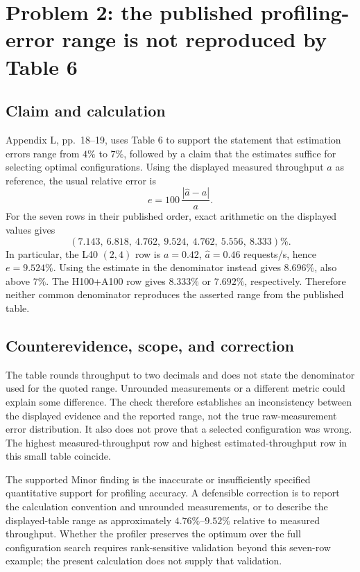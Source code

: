 \documentclass[10pt]{article}
\begin{document}
\section*{Problem 2: the published profiling-error range is not reproduced by Table 6}
\subsection*{Claim and calculation}
Appendix L, pp. 18–19, uses Table 6 to support the statement that estimation errors range from \(4\%\) to \(7\%\), followed by a claim that the estimates suffice for selecting optimal configurations. Using the displayed measured throughput \(a\) as reference, the usual relative error is \[e=100\,\frac{|\widehat a-a|}{a}.\] For the seven rows in their published order, exact arithmetic on the displayed values gives \[(7.143,\ 6.818,\ 4.762,\ 9.524,\ 4.762,\ 5.556,\ 8.333)\%.\] In particular, the L40 \((2,4)\) row is \(a=0.42\), \(\widehat a=0.46\) requests/s, hence \(e=9.524\%\). Using the estimate in the denominator instead gives \(8.696\%\), also above \(7\%\). The H100+A100 row gives \(8.333\%\) or \(7.692\%\), respectively. Therefore neither common denominator reproduces the asserted range from the published table.\par
\subsection*{Counterevidence, scope, and correction}
The table rounds throughput to two decimals and does not state the denominator used for the quoted range. Unrounded measurements or a different metric could explain some difference. The check therefore establishes an inconsistency between the displayed evidence and the reported range, not the true raw-measurement error distribution. It also does not prove that a selected configuration was wrong. The highest measured-throughput row and highest estimated-throughput row in this small table coincide.\par
The supported Minor finding is the inaccurate or insufficiently specified quantitative support for profiling accuracy. A defensible correction is to report the calculation convention and unrounded measurements, or to describe the displayed-table range as approximately \(4.76\%\)–\(9.52\%\) relative to measured throughput. Whether the profiler preserves the optimum over the full configuration search requires rank-sensitive validation beyond this seven-row example; the present calculation does not supply that validation.\par
\end{document}
